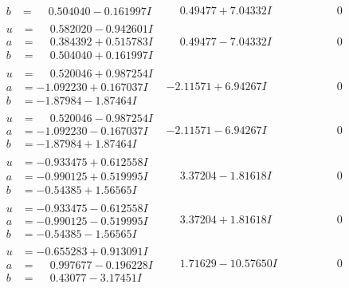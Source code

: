 \documentclass[1p]{elsarticle_modified}
\theoremstyle{definition}
\begin{document}
$$\begin{array}{c|c|c}
\begin{aligned}
b &= \phantom{-}0.504040 - 0.161997 I\end{aligned}
 & \phantom{-}0.49477 + 7.04332 I & \phantom{-0.000000 } 0 \\ \hline\begin{aligned}
u &= \phantom{-}0.582020 - 0.942601 I \\
a &= \phantom{-}0.384392 + 0.515783 I \\
b &= \phantom{-}0.504040 + 0.161997 I\end{aligned}
 & \phantom{-}0.49477 - 7.04332 I & \phantom{-0.000000 } 0 \\ \hline\begin{aligned}
u &= \phantom{-}0.520046 + 0.987254 I \\
a &= -1.092230 + 0.167037 I \\
b &= -1.87984 - 1.87464 I\end{aligned}
 & -2.11571 + 6.94267 I & \phantom{-0.000000 } 0 \\ \hline\begin{aligned}
u &= \phantom{-}0.520046 - 0.987254 I \\
a &= -1.092230 - 0.167037 I \\
b &= -1.87984 + 1.87464 I\end{aligned}
 & -2.11571 - 6.94267 I & \phantom{-0.000000 } 0 \\ \hline\begin{aligned}
u &= -0.933475 + 0.612558 I \\
a &= -0.990125 + 0.519995 I \\
b &= -0.54385 + 1.56565 I\end{aligned}
 & \phantom{-}3.37204 - 1.81618 I & \phantom{-0.000000 } 0 \\ \hline\begin{aligned}
u &= -0.933475 - 0.612558 I \\
a &= -0.990125 - 0.519995 I \\
b &= -0.54385 - 1.56565 I\end{aligned}
 & \phantom{-}3.37204 + 1.81618 I & \phantom{-0.000000 } 0 \\ \hline\begin{aligned}
u &= -0.655283 + 0.913091 I \\
a &= \phantom{-}0.997677 - 0.196228 I \\
b &= \phantom{-}0.43077 - 3.17451 I\end{aligned}
 & \phantom{-}1.71629 - 10.57650 I & \phantom{-0.000000 } 0 \\ \hline\begin{aligned}

\end{aligned}
\end{array}$$
\end{document}
